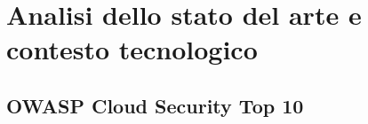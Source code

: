 
\chapter{Analisi dello stato del arte e contesto tecnologico} %
\label{cap:stato-arte}
%


\section{OWASP Cloud Security Top 10}

